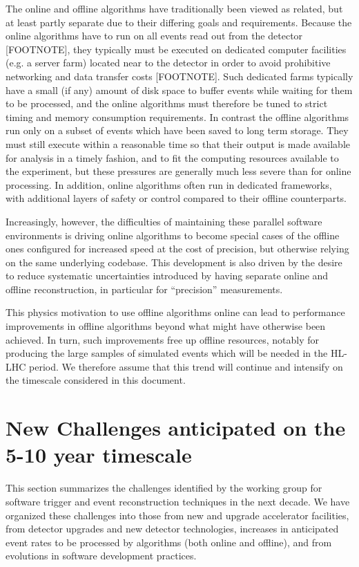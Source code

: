 The online and offline algorithms have traditionally been viewed as related, but at least partly separate due to their differing goals and requirements. Because the online algorithms have to run on all events read out from the detector [FOOTNOTE], they typically must be executed on dedicated computer facilities (e.g. a server farm) located near to the detector in order to avoid prohibitive networking and data transfer costs [FOOTNOTE]. Such dedicated farms typically have a small (if any) amount of disk space to buffer events while waiting for them to be processed, and the online algorithms must therefore be tuned to strict timing and memory consumption requirements. In contrast the offline algorithms run only on a subset of events which have been saved to long term storage. They must still execute within a reasonable time so that their output is made available for analysis in a timely fashion, and to fit the computing resources available to the experiment, but these pressures are generally much less severe than for online processing. In addition, online algorithms often run in dedicated frameworks, with additional layers of safety or control compared to their offline counterparts. 

Increasingly, however, the difficulties of maintaining these parallel software environments is driving online algorithms to become special cases of the offline ones configured for increased speed at the cost of precision, but otherwise relying on the same underlying codebase. This development is also driven by the desire to reduce systematic uncertainties introduced by having separate online and offline reconstruction, in particular for “precision” measurements.

This physics motivation to use offline algorithms online can lead to performance improvements in offline algorithms beyond what might have otherwise been achieved. In turn, such improvements free up offline resources, notably for producing the large samples of simulated events which will be needed in the HL-LHC period. We therefore assume that this trend will continue and intensify on the timescale considered in this document.

\section{New Challenges anticipated on the 5-10 year timescale}

This section summarizes the challenges identified by the working group for software trigger and event reconstruction techniques in the next decade. We have organized these challenges into those from new and upgrade accelerator facilities, from detector upgrades and new detector technologies, increases in anticipated event rates to be processed by algorithms (both online and offline), and from evolutions in software development practices.

